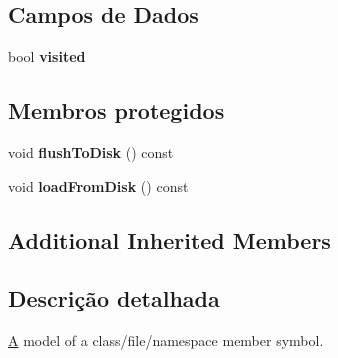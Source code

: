 \subsection*{Campos de Dados}
\begin{DoxyCompactItemize}
\item 
\hypertarget{class_member_def_a1df99df902f5f6e81ec3e21e9c07360e}{bool {\bfseries visited}}\label{class_member_def_a1df99df902f5f6e81ec3e21e9c07360e}

\end{DoxyCompactItemize}
\subsection*{Membros protegidos}
\begin{DoxyCompactItemize}
\item 
\hypertarget{class_member_def_a5e5c162b785bfad12bcff67ea0d7f232}{void {\bfseries flush\-To\-Disk} () const }\label{class_member_def_a5e5c162b785bfad12bcff67ea0d7f232}

\item 
\hypertarget{class_member_def_ab314b200ae76bd2d213e1710ea172f81}{void {\bfseries load\-From\-Disk} () const }\label{class_member_def_ab314b200ae76bd2d213e1710ea172f81}

\end{DoxyCompactItemize}
\subsection*{Additional Inherited Members}


\subsection{Descrição detalhada}
\hyperlink{class_a}{A} model of a class/file/namespace member symbol. 

